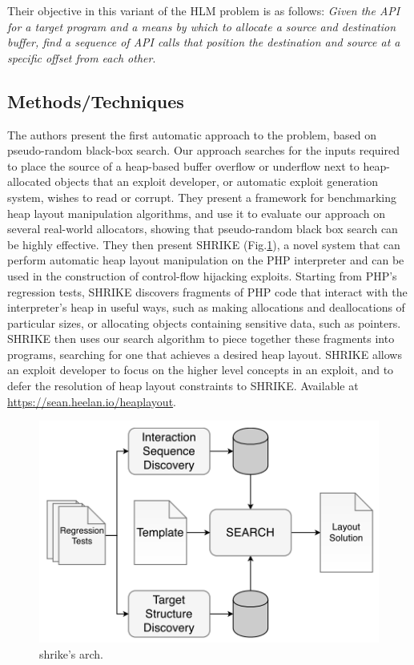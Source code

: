 Their objective in this variant of the HLM problem is as follows: \emph{Given the API for a target program and a means by which to allocate a source and destination buffer, find a sequence of API calls that position the destination and source at a specific offset from each other}.
\subsection{Methods/Techniques}
The authors present the first automatic approach to the problem, based on pseudo-random black-box search. Our approach searches for the inputs required to place the source of a heap-based buffer overflow or underflow next to heap-allocated objects that an exploit developer, or automatic exploit generation system, wishes to read or corrupt. They present a framework for benchmarking heap layout manipulation algorithms, and use it to evaluate our approach on several real-world allocators, showing that pseudo-random black box search can be highly effective. They then present SHRIKE (Fig.\ref{fig:shrike}), a novel system that can perform automatic heap layout manipulation on the PHP interpreter and can be used in the construction of control-flow hijacking exploits. Starting from PHP’s regression tests, SHRIKE discovers fragments of PHP code that interact with the interpreter’s heap in useful ways, such as making allocations and deallocations of particular sizes, or allocating objects containing sensitive data, such as pointers. SHRIKE then uses our search algorithm to piece together these fragments into programs, searching for one that achieves a desired heap layout. SHRIKE allows an exploit developer to focus on the higher level concepts in an exploit, and to defer the resolution of heap layout constraints to SHRIKE. Available at \url{https://sean.heelan.io/heaplayout}.
\begin{figure}[h]
    \centering
    \includegraphics[width=0.7\linewidth]{shrike.png} %
    \caption{shrike's arch.}	
    \label{fig:shrike}
\end{figure}
